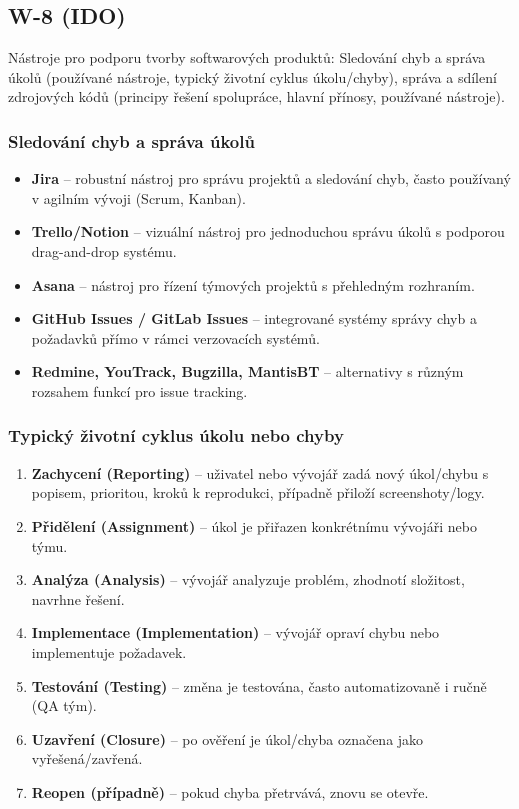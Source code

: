 \subsection{W-8 (IDO)}
Nástroje pro podporu tvorby softwarových produktů: Sledování chyb a správa úkolů (používané nástroje, typický životní cyklus úkolu/chyby), správa a sdílení zdrojových kódů (principy řešení spolupráce, hlavní přínosy, používané nástroje).

\subsubsection*{Sledování chyb a správa úkolů}
\begin{itemize}
  \item \textbf{Jira} – robustní nástroj pro správu projektů a sledování chyb, často používaný v agilním vývoji (Scrum, Kanban).
  \item \textbf{Trello/Notion} – vizuální nástroj pro jednoduchou správu úkolů s podporou drag-and-drop systému.
  \item \textbf{Asana} – nástroj pro řízení týmových projektů s přehledným rozhraním.
  \item \textbf{GitHub Issues / GitLab Issues} – integrované systémy správy chyb a požadavků přímo v rámci verzovacích systémů.
  \item \textbf{Redmine, YouTrack, Bugzilla, MantisBT} – alternativy s různým rozsahem funkcí pro issue tracking.
\end{itemize}

\subsubsection*{Typický životní cyklus úkolu nebo chyby}
\begin{enumerate}
  \item \textbf{Zachycení (Reporting)} – uživatel nebo vývojář zadá nový úkol/chybu s popisem, prioritou, kroků k reprodukci, případně přiloží screenshoty/logy.
  \item \textbf{Přidělení (Assignment)} – úkol je přiřazen konkrétnímu vývojáři nebo týmu.
  \item \textbf{Analýza (Analysis)} – vývojář analyzuje problém, zhodnotí složitost, navrhne řešení.
  \item \textbf{Implementace (Implementation)} – vývojář opraví chybu nebo implementuje požadavek.
  \item \textbf{Testování (Testing)} – změna je testována, často automatizovaně i ručně (QA tým).
  \item \textbf{Uzavření (Closure)} – po ověření je úkol/chyba označena jako vyřešená/zavřená.
  \item \textbf{Reopen (případně)} – pokud chyba přetrvává, znovu se otevře.
\end{enumerate}

